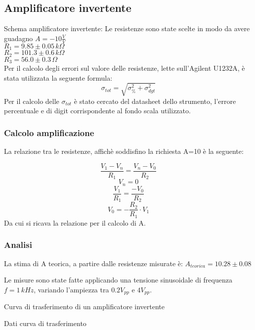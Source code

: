 \subsection{Amplificatore invertente}
Schema amplificatore invertente:
Le resistenze sono state scelte in modo da avere guadagno $A=-10 \frac{V}{V}$\\
$R_1=9.85 \pm 0.05\,k\Omega $\\ %
$R_2=101.3 \pm 0.6\,k\Omega$\\ %
$R_3=56.0 \pm 0.3\,\Omega$\\ %

Per il calcolo degli errori sul valore delle resistenze, lette sull'Agilent U1232A, è stata utilizzata la seguente formula:
$$\sigma_{tot}=\sqrt{ \sigma^{2} _{\%} + \sigma^{2} _{dgt}}$$
Per il calcolo delle $\sigma_{tot}$ è stato cercato del datasheet dello strumento, l'errore percentuale e di digit
corrispondente al fondo scala utilizzato.

\subsubsection{Calcolo amplificazione}
La relazione tra le resistenze, affichè soddisfino la richiesta A=10 è la seguente:

$$\frac{V_1-V_n}{R_1}=\frac{V_n-V_0}{R_2}$$
$$V_n=0$$
$$\frac{V_1}{R_1}=\frac{-V_0}{R_2}$$
$$V_0=-\frac{R_2}{R_1} \cdot V_1$$
Da cui si ricava la relazione per il calcolo di A.

\subsubsection{Analisi}
La stima di A teorica, a partire dalle resistenze misurate è:
$A_{teorica}=10.28 \pm 0.08$ %

Le misure sono state fatte applicando una tensione sinusoidale di frequenza $ f=1 \,kHz$, variando l'ampiezza tra 
$0.2 V_{pp}$ e $4 V_{pp}$.

\begin{grafico} 
 \centering 
  
 \caption{Curva di trasferimento di un amplificatore invertente} 
 \label{gr:amp_inv.tex} 
\end{grafico}

\begin{tabella}
 \centering
  
 \caption{Dati curva di trasferimento}
 \label{tab:tab_inv.tex}
\end{tabella}

